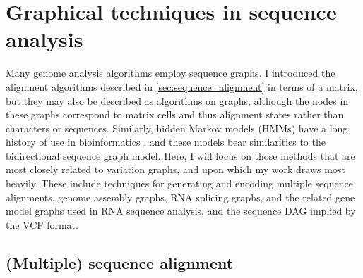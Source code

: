 \section{Graphical techniques in sequence analysis}

Many genome analysis algorithms employ sequence graphs.
I introduced the alignment algorithms described in \ref{sec:sequence_alignment} in terms of a matrix, but they may also be described as algorithms on graphs, although the nodes in these graphs correspond to matrix cells and thus alignment states rather than characters or sequences.
Similarly, hidden Markov models (HMMs) have a long history of use in bioinformatics \cite{durbin1998biological}, and these models bear similarities to the bidirectional sequence graph model.
Here, I will focus on those methods that are most closely related to variation graphs, and upon which my work draws most heavily.
These include techniques for generating and encoding multiple sequence alignments, genome assembly graphs, RNA splicing graphs, and the related gene model graphs used in RNA sequence analysis, and the sequence DAG implied by the VCF format.

\subsection{(Multiple) sequence alignment}
\label{sec:MSA}

